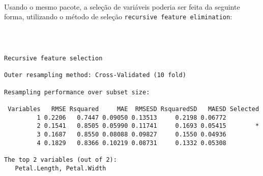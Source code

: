 \documentclass[
  a4paperpaper,
]{article}
\newenvironment{Shaded}{\begin{snugshade}}{\end{snugshade}}
\newcommand{\AttributeTok}[1]{\textcolor[rgb]{0.40,0.45,0.13}{#1}}
\newcommand{\DecValTok}[1]{\textcolor[rgb]{0.68,0.00,0.00}{#1}}
\newcommand{\FunctionTok}[1]{\textcolor[rgb]{0.28,0.35,0.67}{#1}}
\newcommand{\NormalTok}[1]{\textcolor[rgb]{0.00,0.23,0.31}{#1}}
\newcommand{\OtherTok}[1]{\textcolor[rgb]{0.00,0.23,0.31}{#1}}
\newcommand{\SpecialCharTok}[1]{\textcolor[rgb]{0.37,0.37,0.37}{#1}}
\newcommand{\StringTok}[1]{\textcolor[rgb]{0.13,0.47,0.30}{#1}}
\begin{document}
~

Usando o mesmo pacote, a seleção de variáveis poderia ser feita da
seguinte forma, utilizando o método de seleção
\texttt{recursive\ feature\ elimination}:

~

\begin{Shaded}
\end{Shaded}

\begin{verbatim}

Recursive feature selection

Outer resampling method: Cross-Validated (10 fold) 

Resampling performance over subset size:

 Variables   RMSE Rsquared     MAE  RMSESD RsquaredSD   MAESD Selected
         1 0.2206   0.7447 0.09050 0.13513     0.2198 0.06772         
         2 0.1541   0.8505 0.05990 0.11741     0.1693 0.05415        *
         3 0.1687   0.8550 0.08088 0.09827     0.1550 0.04936         
         4 0.1829   0.8366 0.10219 0.08731     0.1332 0.05308         

The top 2 variables (out of 2):
   Petal.Length, Petal.Width
\end{verbatim}
\end{document}
